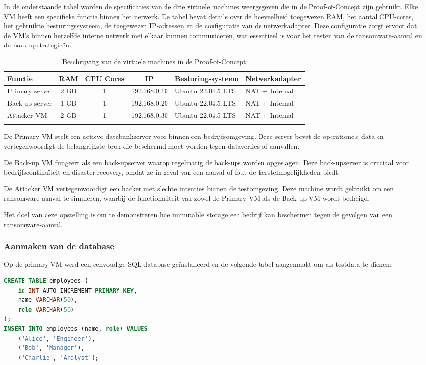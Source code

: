 In de onderstaande tabel worden de specificaties van de drie virtuele machines weergegeven die in de Proof-of-Concept zijn gebruikt. Elke VM heeft een specifieke functie binnen het netwerk. De tabel bevat details over de hoeveelheid toegewezen RAM, het aantal CPU-cores, het gebruikte besturingssysteem, de toegewezen IP-adressen en de configuratie van de netwerkadapter. Deze configuratie zorgt ervoor dat de VM's binnen hetzelfde interne netwerk met elkaar kunnen communiceren, wat essentieel is voor het testen van de ransomware-aanval en de back-upstrategieën.
\begin{longtable}{|l|c|c|c|l|l|}
    \hline
    \textbf{Functie} & \textbf{RAM} & \textbf{CPU Cores} & \textbf{IP} & \textbf{Besturingssysteem} & \textbf{Netwerkadapter} \\ \hline
    Primary server    & 2 GB         & 1                  & 192.168.0.10 & Ubuntu 22.04.5 LTS & NAT + Internal \\ \hline
    Back-up server           & 1 GB         & 1                  & 192.168.0.20 & Ubuntu 22.04.5 LTS & NAT + Internal \\ \hline
    Attacker VM         & 2 GB         & 1                  & 192.168.0.30 & Ubuntu 22.04.5 LTS     & NAT + Internal \\ \hline
    
\caption{Beschrijving van de virtuele machines in de Proof-of-Concept}
\end{longtable}

De Primary VM stelt een actieve databankserver voor binnen een bedrijfsomgeving. Deze server bevat de operationele data en vertegenwoordigt de belangrijkste bron die beschermd moet worden tegen dataverlies of aanvallen. 

De Back-up VM fungeert als een back-upserver waarop regelmatig de back-ups worden opgeslagen. Deze back-upserver is cruciaal voor bedrijfscontinuïteit en disaster recovery, omdat ze in geval van een aanval of fout de herstelmogelijkheden biedt. 

De Attacker VM vertegenwoordigt een hacker met slechte intenties binnen de testomgeving. Deze machine wordt gebruikt om een ransomware-aanval te simuleren, waarbij de functionaliteit van zowel de Primary VM als de Back-up VM wordt bedreigd. 

Het doel van deze opstelling is om te demonstreren hoe immutable storage een bedrijf kan beschermen tegen de gevolgen van een ransomware-aanval.
\subsubsection{Aanmaken van de database}
Op de primary VM werd een eenvoudige SQL-database geïnstalleerd en de volgende tabel aangemaakt om als testdata te dienen:
\begin{lstlisting}[language=SQL, caption={MySQL-code voor het aanmaken van de testdatabank.}]
CREATE TABLE employees (
    id INT AUTO_INCREMENT PRIMARY KEY,
    name VARCHAR(50),
    role VARCHAR(50)
);
INSERT INTO employees (name, role) VALUES 
    ('Alice', 'Engineer'), 
    ('Bob', 'Manager'), 
    ('Charlie', 'Analyst');
\end{lstlisting}



